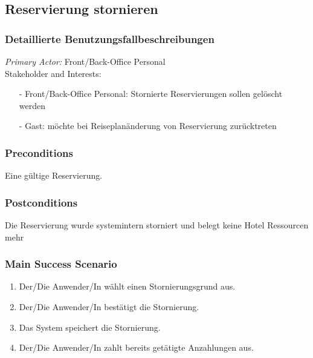 \documentclass[./detailed_overview_usecases.tex]{subfiles}
\begin{document}
    \subsection{Reservierung stornieren}
    \subsubsection{Detaillierte Benutzungsfallbeschreibungen}
    \textit{Primary Actor:}
    Front/Back-Office Personal
    \\
    Stakeholder and Interests:
    \begin{itemize}
        \item[-] Front/Back-Office Personal: Stornierte Reservierungen sollen gelöscht werden
        \item[-] Gast: möchte bei Reiseplanänderung von Reservierung zurücktreten
    \end{itemize}

    \subsubsection*{Preconditions}
    Eine gültige Reservierung.

    \subsubsection*{Postconditions}
    Die Reservierung wurde systemintern storniert und belegt keine Hotel Ressourcen mehr

    \subsubsection*{Main Success Scenario}
    \begin{enumerate}
        \item Der/Die Anwender/In wählt einen Stornierungsgrund aus.
        \item Der/Die Anwender/In bestätigt die Stornierung.
        \item Das System speichert die Stornierung.
        \item Der/Die Anwender/In zahlt bereits getätigte Anzahlungen aus.
    \end{enumerate}
\end{document}
